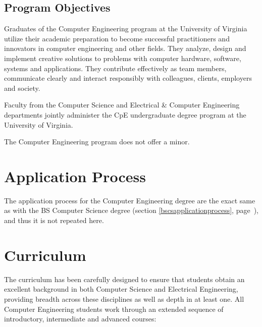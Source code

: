\documentclass[10pt,letter,twocolumn]{book}
\newcommand{\mysection}[1]{\section{#1}\renewcommand{\rightmark}{#1}}
\begin{document}

\subsection{Program Objectives}

Graduates of the Computer Engineering program at the
University of Virginia utilize their academic preparation
to become successful practitioners and innovators in
computer engineering and other fields. They analyze,
design and implement creative solutions to problems
with computer hardware, software, systems and
applications. They contribute effectively as team
members, communicate clearly and interact responsibly
with colleagues, clients, employers and society.

Faculty from the Computer Science and Electrical \& Computer
Engineering departments jointly administer the CpE undergraduate
degree program at the University of Virginia.

The Computer Engineering program does not offer a minor.


\mysection{Application Process}
\label{bscpeapplicationprocess}

The application process for the Computer Engineering degree are the
exact same as with the BS Computer Science degree (section
\ref{bscsapplicationprocess}, page~\pageref{bscsapplicationprocess}),
and thus it is not repeated here.


\mysection{Curriculum} %

The curriculum has been carefully designed to ensure that students
obtain an excellent background in both Computer Science and Electrical
Engineering, providing breadth across these disciplines as well as
depth in at least one. All Computer Engineering students work through
an extended sequence of introductory, intermediate and advanced
courses:
\end{document}
